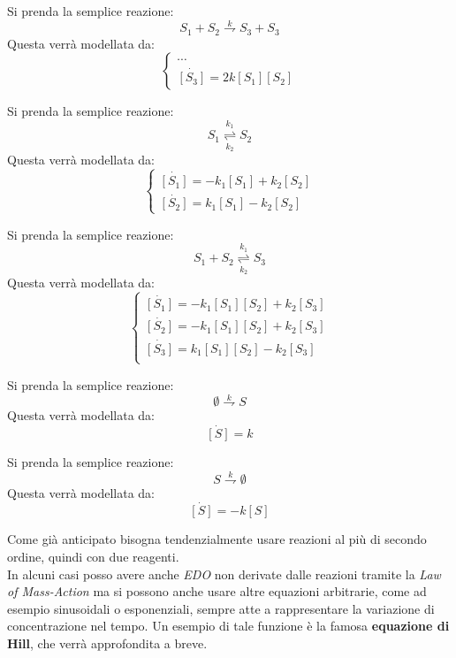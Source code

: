 \documentclass[a4paper,12pt, oneside]{book}
\begin{document}
\begin{esempio}
  Si prenda la semplice reazione:
  \[S_1 +S_2\stackrel{k}{\rightharpoondown} S_3+S_3\]
  Questa verrà modellata da:
  \[
    \begin{cases}
      \cdots\\
      \dot{[S_3]}=2k[S_1][S_2]
    \end{cases}
  \]
\end{esempio}
\begin{esempio}
  Si prenda la semplice reazione:
  \[S_1 \underset{k_2}{\stackrel{k_1}{\rightleftharpoons}} S_2\]
  Questa verrà modellata da:
  \[
    \begin{cases}
      \dot{[S_1]}=-k_1[S_1]+k_2[S_2]\\
      \dot{[S_2]}=k_1[S_1]-k_2[S_2]
    \end{cases}
  \]
\end{esempio}
\begin{esempio}
  Si prenda la semplice reazione:
  \[S_1 +S_2\underset{k_2}{\stackrel{k_1}{\rightleftharpoons}} S_3\]
  Questa verrà modellata da:
  \[
    \begin{cases}
      \dot{[S_1]}=-k_1[S_1][S_2]+k_2[S_3]\\
      \dot{[S_2]}=-k_1[S_1][S_2]+k_2[S_3]\\
      \dot{[S_3]}=k_1[S_1][S_2]-k_2[S_3]\\
    \end{cases}
  \]
\end{esempio}
\begin{esempio}
  Si prenda la semplice reazione:
  \[\emptyset \stackrel{k}{\rightharpoondown} S\]
  Questa verrà modellata da:
  \[
    \dot{[S]}=k
  \]
\end{esempio}
\begin{esempio}
  Si prenda la semplice reazione:
  \[S \stackrel{k}{\rightharpoondown} \emptyset\]
  Questa verrà modellata da:
  \[
    \dot{[S]}=-k[S]
  \]
\end{esempio}
Come già anticipato bisogna tendenzialmente usare reazioni al più di secondo
ordine, quindi con due reagenti.\\
In alcuni casi posso avere anche \textit{EDO} non derivate dalle reazioni
tramite la \textit{Law of Mass-Action} ma si possono anche usare altre equazioni
arbitrarie, come ad esempio sinusoidali o esponenziali, sempre atte a
rappresentare la variazione di concentrazione nel tempo. Un esempio di tale
funzione è la famosa \textbf{equazione di Hill}, che verrà approfondita a
breve.\\
\end{document}
